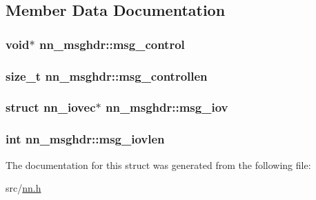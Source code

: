 \subsection{Member Data Documentation}
\subsubsection[{msg\+\_\+control}]{\setlength{\rightskip}{0pt plus 5cm}void$\ast$ nn\+\_\+msghdr\+::msg\+\_\+control}\hypertarget{structnn__msghdr_aefe793fcf0d1b3d858e7fc8eaf1325eb}{}\label{structnn__msghdr_aefe793fcf0d1b3d858e7fc8eaf1325eb}
\subsubsection[{msg\+\_\+controllen}]{\setlength{\rightskip}{0pt plus 5cm}size\+\_\+t nn\+\_\+msghdr\+::msg\+\_\+controllen}\hypertarget{structnn__msghdr_a100313e447a48a9514790be57cd799a6}{}\label{structnn__msghdr_a100313e447a48a9514790be57cd799a6}
\subsubsection[{msg\+\_\+iov}]{\setlength{\rightskip}{0pt plus 5cm}struct {\bf nn\+\_\+iovec}$\ast$ nn\+\_\+msghdr\+::msg\+\_\+iov}\hypertarget{structnn__msghdr_ad1f1c756e54ba58d8263e6ec4d00cf28}{}\label{structnn__msghdr_ad1f1c756e54ba58d8263e6ec4d00cf28}
\subsubsection[{msg\+\_\+iovlen}]{\setlength{\rightskip}{0pt plus 5cm}int nn\+\_\+msghdr\+::msg\+\_\+iovlen}\hypertarget{structnn__msghdr_a0cf9a6f1b92f55a55f0ccc0184f6ff3b}{}\label{structnn__msghdr_a0cf9a6f1b92f55a55f0ccc0184f6ff3b}


The documentation for this struct was generated from the following file\+:\begin{DoxyCompactItemize}
\item 
src/\hyperlink{nn_8h}{nn.\+h}\end{DoxyCompactItemize}
